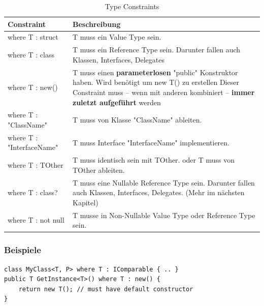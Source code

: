 \documentclass[
a4paper,
oneside,
10pt,
fleqn,
headsepline,
toc=listofnumbered, 
bibliography=totocnumbered]{scrartcl}
\begin{document}
\begin{table}[ht]
	\centering
	\begin{tabu} to \linewidth {l X}
		\toprule
		Constraint                & Beschreibung                                                                                           \\
		\midrule
		where T : struct          & T muss ein Value Type sein.                                                                            \\
		where T : class           & T muss ein Reference Type sein. Darunter fallen auch Klassen, Interfaces, Delegates                    \\
		where T : new()           & T muss einen \textbf{parameterlosen} "public" Konstruktor haben. Wird benötigt um new T() zu erstellen
		Dieser Constraint muss – wenn mit anderen kombiniert – \textbf{immer zuletzt
		aufgeführt} werden                                                                                                                 \\
		where T : "ClassName"     & T muss von Klasse "ClassName" ableiten.                                                                \\
		where T : "InterfaceName" & T muss Interface "InterfaceName" implementieren.                                                       \\
		where T : TOther          & T muss identisch sein mit TOther.
		oder
		T muss von TOther ableiten.                                                                                                        \\
		where T : class?          & T muss eine Nullable Reference Type sein.
		Darunter fallen auch Klassen, Interfaces, Delegates. (Mehr im nächsten Kapitel)                                                    \\
		where T : not null        & T musse in Non-Nullable Value Type oder Reference Type sein.                                           \\
		\bottomrule
	\end{tabu}
	\caption{Type Constraints}
\end{table}
\subsubsection{Beispiele}
\begin{lstlisting}
class MyClass<T, P> where T : IComparable { .. }
public T GetInstance<T>() where T : new() {
	return new T(); // must have default constructor
}
\end{lstlisting}
\end{document}
